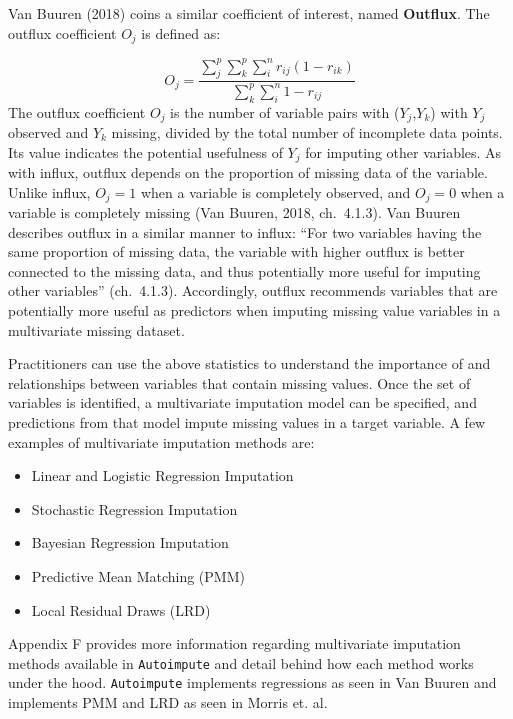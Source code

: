 \documentclass[12pt,oneside]{chicagocapstone}
\providecommand{\tightlist}{%
  \setlength{\itemsep}{0pt}\setlength{\parskip}{0pt}}
\begin{document}
Van Buuren (2018) coins a similar coefficient of interest, named
\textbf{Outflux}. The outflux coefficient \(O_j\) is defined as:

\[O_j = \frac{\sum_j^p\sum_k^p\sum_i^n r_{ij}(1-r_{ik})}{\sum_k^p\sum_i^n 1-r_{ij}}\]
The outflux coefficient \(O_j\) is the number of variable pairs with
(\(Y_j\),\(Y_k\)) with \(Y_j\) observed and \(Y_k\) missing, divided by
the total number of incomplete data points. Its value indicates the
potential usefulness of \(Y_j\) for imputing other variables. As with
influx, outflux depends on the proportion of missing data of the
variable. Unlike influx, \(O_j=1\) when a variable is completely
observed, and \(O_j=0\) when a variable is completely missing (Van
Buuren, 2018, ch.~4.1.3). Van Buuren describes outflux in a similar
manner to influx: ``For two variables having the same proportion of
missing data, the variable with higher outflux is better connected to
the missing data, and thus potentially more useful for imputing other
variables'' (ch.~4.1.3). Accordingly, outflux recommends variables that
are potentially more useful as predictors when imputing missing value
variables in a multivariate missing dataset.

Practitioners can use the above statistics to understand the importance
of and relationships between variables that contain missing values. Once
the set of variables is identified, a multivariate imputation model can
be specified, and predictions from that model impute missing values in a
target variable. A few examples of multivariate imputation methods are:
\begin{itemize}
\tightlist
\item
  Linear and Logistic Regression Imputation
\item
  Stochastic Regression Imputation
\item
  Bayesian Regression Imputation
\item
  Predictive Mean Matching (PMM)
\item
  Local Residual Draws (LRD)
\end{itemize}
Appendix F provides more information regarding multivariate imputation
methods available in \texttt{Autoimpute} and detail behind how each
method works under the hood. \texttt{Autoimpute} implements regressions
as seen in Van Buuren and implements PMM and LRD as seen in Morris et.
al.
\end{document}
